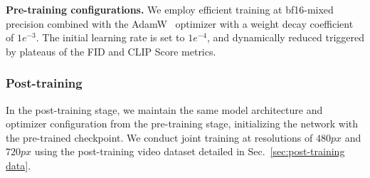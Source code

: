 \noindent\textbf{Pre-training configurations.}
We employ efficient training at bf16-mixed precision combined with the AdamW~\citep{adamw, adam} optimizer with a weight decay coefficient of $1e^{-3}$.
The initial learning rate is set to $1e^{-4}$, and dynamically reduced triggered by plateaus of the FID and CLIP Score metrics.

\subsubsection{Post-training}

In the post-training stage, we maintain the same model architecture and optimizer configuration from the pre-training stage, initializing the network with the pre-trained checkpoint. We conduct joint training at resolutions of $480 px$ and $720 px$ using the post-training video dataset detailed in Sec.~\ref{sec:post-training data}.